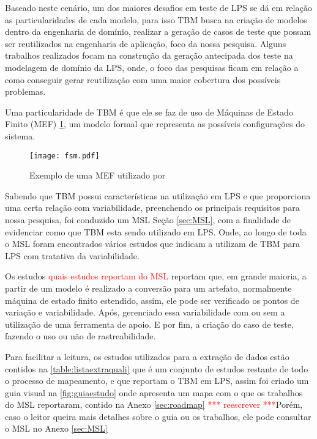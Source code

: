 Baseado neste cenário, um dos maiores desafios em teste de LPS se dá em relação as particularidades de cada modelo, para isso TBM busca na criação de modelos dentro da engenharia de domínio, realizar a geração de casos de teste que possam ser reutilizados na engenharia de aplicação, foco da nossa pesquisa. Alguns trabalhos realizados focam na construção da geração antecipada dos teste na modelagem de domínio da LPS, onde, o foco das pesquisas ficam em relação a como conseguir gerar reutilização com uma maior cobertura dos possíveis problemas.

Uma particularidade de TBM é que ele se faz de uso de Máquinas de Estado Finito (MEF) \ref{fig:tbmmef}, um modelo formal que representa as possíveis configurações do sistema.

\begin{figure}[htb]
	\centering
	\texttt{[image: fsm.pdf]}
	\caption{ Exemplo de uma MEF utilizado por \citealp{costa2016split}}
	\label{fig:tbmmef}
\end{figure}

Sabendo que TBM possui características na utilização em LPS e que proporciona uma certa relação com variabilidade, preenchendo os principais requisitos para nossa pesquisa, foi conduzido um MSL Seção \ref{sec:MSL}, com a finalidade de evidenciar como que TBM esta sendo utilizado em LPS. Onde, ao longo de toda o MSL foram encontrados vários estudos que indicam a utilizam de TBM para LPS com tratativa da variabilidade.

Os estudos \textcolor{red}{quais estudos reportam do MSL} reportam que, em grande maioria, a partir de um modelo é realizado a conversão para um artefato, normalmente máquina de estado finito estendido, assim, ele pode ser verificado os pontos de variação e variabilidade. Após, gerenciado essa variabilidade com ou sem a utilização de uma ferramenta de apoio. E por fim, a criação do caso de teste, fazendo o uso ou não de rastreabilidade.

Para facilitar a leitura, os estudos utilizados para a extração de dados estão contidos na \ref{table:listaextraquali} que é um conjunto de estudos restante de todo o processo de mapeamento, e que reportam o TBM em LPS, assim foi criado um guia visual na \ref{fig:guiaestudo} onde apresenta um mapa com o que os trabalhos do MSL reportaram, contido na Anexo \ref{sec:roadmap} \textcolor{red}{*** reescrever ***}Porém, caso o leitor queira mais detalhes sobre o guia ou os trabalhos, ele pode consultar o MSL no Anexo \ref{sec:MSL}

